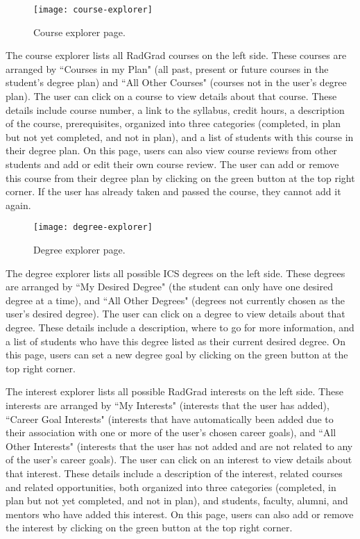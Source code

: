 \begin{figure}[htbp!]
\centering
\texttt{[image: course-explorer]}
\caption{Course explorer page.}
\end{figure}

The course explorer lists all RadGrad courses on the left side. These courses are arranged by ``Courses in my Plan" (all past, present or future courses in the student's degree plan) and ``All Other Courses" (courses not in the user's degree plan). The user can click on a course to view details about that course. These details include course number, a link to the syllabus, credit hours, a description of the course, prerequisites, organized into three categories (completed, in plan but not yet completed, and not in plan), and a list of students with this course in their degree plan. On this page, users can also view course reviews from other students and add or edit their own course review. The user can add or remove this course from their degree plan by clicking on the green button at the top right corner. If the user has already taken and passed the course, they cannot add it again.

\begin{figure}[htbp!]
\centering
\texttt{[image: degree-explorer]}
\caption{Degree explorer page.}
\end{figure}

The degree explorer lists all possible ICS degrees on the left side. These degrees are arranged by ``My Desired Degree" (the student can only have one desired degree at a time), and ``All Other Degrees" (degrees not currently chosen as the user's desired degree). The user can click on a degree to view details about that degree. These details include a description, where to go for more information, and a list of students who have this degree listed as their current desired degree. On this page, users can set a new degree goal by clicking on the green button at the top right corner.

The interest explorer lists all possible RadGrad interests on the left side. These interests are arranged by ``My Interests" (interests that the user has added), ``Career Goal Interests" (interests that have automatically been added due to their association with one or more of the user's chosen career goals), and ``All Other Interests" (interests that the user has not added and are not related to any of the user's career goals). The user can click on an interest to view details about that interest. These details include a description of the interest, related courses and related opportunities, both organized into three categories (completed, in plan but not yet completed, and not in plan), and students, faculty, alumni, and mentors who have added this interest. On this page, users can also add or remove the interest by clicking on the green button at the top right corner.

